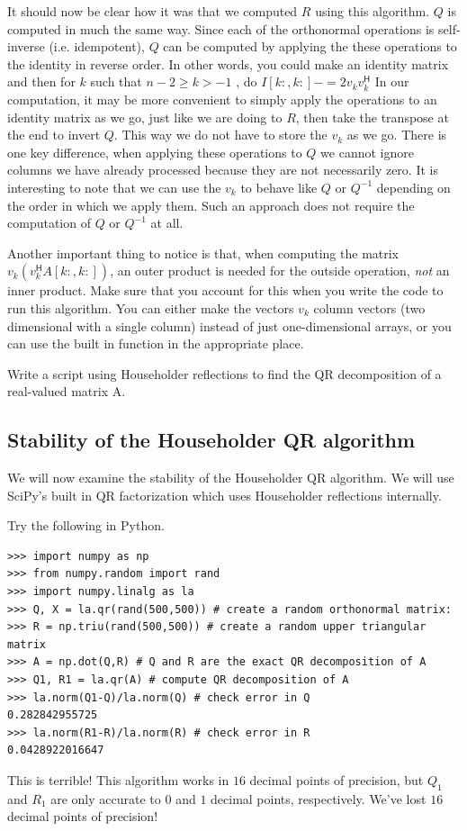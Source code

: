 It should now be clear how it was that we computed $R$ using this algorithm.
$Q$ is computed in much the same way.
Since each of the orthonormal operations is self-inverse (i.e. idempotent), $Q$ can be computed by applying the these operations to the identity in reverse order.
In other words, you could make an identity matrix and then for $k$ such that $n-2 \geq k > -1$ , do $I[k:,k:] -= 2 v_k v_k^\mathsf{H}$
In our computation, it may be more convenient to simply apply the operations to an identity matrix as we go, just like we are doing to $R$, then take the transpose at the end to invert $Q$.
This way we do not have to store the $v_k$ as we go.
There is one key difference, when applying these operations to $Q$ we cannot ignore columns we have already processed because they are not necessarily zero.
It is interesting to note that we can use the $v_k$ to behave like $Q$ or $Q^{-1}$ depending on the order in which we apply them.
Such an approach does not require the computation of $Q$ or $Q^{-1}$ at all.

Another important thing to notice is that, when computing the matrix $v_k \left( v_k^\mathsf{H} A[k:,k:] \right)$, an outer product is needed for the outside operation, \emph{not} an inner product.
Make sure that you account for this when you write the code to run this algorithm.
You can either make the vectors $v_k$ column vectors (two dimensional with a single column) instead of just one-dimensional arrays, or you can use the built in function  in the appropriate place.

\begin{problem}
Write a script using Householder reflections to find the QR decomposition of a real-valued matrix A.
\label{prob:HouseholderQR}
\end{problem}

\subsection*{Stability of the Householder QR algorithm}
We will now examine the stability of the Householder QR algorithm.
We will use SciPy's built in QR factorization which uses Householder reflections internally.

Try the following in Python.

\begin{lstlisting}
>>> import numpy as np
>>> from numpy.random import rand
>>> import numpy.linalg as la
>>> Q, X = la.qr(rand(500,500)) # create a random orthonormal matrix:
>>> R = np.triu(rand(500,500)) # create a random upper triangular matrix
>>> A = np.dot(Q,R) # Q and R are the exact QR decomposition of A
>>> Q1, R1 = la.qr(A) # compute QR decomposition of A
>>> la.norm(Q1-Q)/la.norm(Q) # check error in Q
0.282842955725
>>> la.norm(R1-R)/la.norm(R) # check error in R
0.0428922016647
\end{lstlisting}
This is terrible! 
This algorithm works in $16$ decimal points of precision, but $Q_1$ and $R_1$ are only accurate to $0$ and $1$ decimal points, respectively.
We've lost $16$ decimal points of precision!

